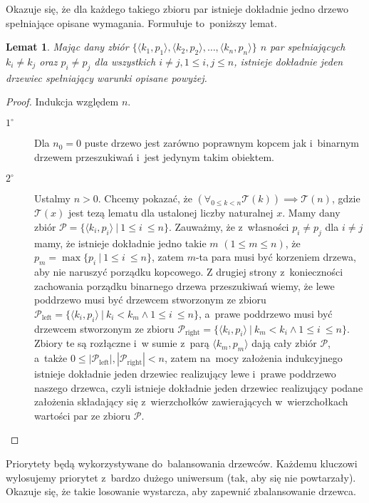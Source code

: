 \documentclass[declaration,shortabstract]{iithesis}
\theoremstyle{definition} \newtheorem{definition}{Definicja}[chapter]
\theoremstyle{plain} \newtheorem{remark}[definition]{Obserwacja}
\theoremstyle{plain} \newtheorem{theorem}[definition]{Twierdzenie}
\theoremstyle{plain} \newtheorem{example}{Przykład}[definition]
\theoremstyle{plain} \newtheorem{lemma}[definition]{Lemat}
\begin{document}
Okazuje się, że dla każdego takiego zbioru par istnieje dokładnie jedno drzewo spełniające opisane wymagania. Formułuje to~poniższy lemat.

\begin{lemma}
    Mając dany zbiór $\{ \langle k_1, p_1 \rangle, \langle k_2, p_2 \rangle, \ldots, \langle k_n, p_n \rangle \}$ $n$ par spełniających $k_i \neq k_j$ oraz $p_i \neq p_j$ dla wszystkich $i \neq j, 1 \leq i, j \leq n$, istnieje dokładnie jeden drzewiec spełniający warunki opisane powyżej.
\end{lemma}

\begin{proof}
Indukcja względem $n$.
\begin{description}
    \item[$1^\circ$] Dla $n_0 = 0$ puste drzewo jest zarówno poprawnym kopcem jak i~binarnym drzewem przeszukiwań i~jest jedynym takim obiektem.
    \item[$2^\circ$] Ustalmy $n > 0$. Chcemy pokazać, że $(\forall_{0 \leq k < n} \mathcal{T}(k)) \implies \mathcal{T}(n)$, gdzie $\mathcal{T}(x)$ jest tezą lematu dla ustalonej liczby naturalnej $x$. Mamy dany zbiór $\mathcal{P} = \{ \langle k_i, p_i \rangle \ | \ 1 \leq i~\leq n \}$. Zauważmy, że z~własności $p_i \neq p_j$ dla $i \neq j$ mamy, że istnieje dokładnie jedno takie $m$ $(1 \leq m \leq n)$, że $p_m = \max \{p_i \ |\ 1 \leq i~\leq n \}$, zatem $m$-ta para musi być korzeniem drzewa, aby nie naruszyć porządku kopcowego. Z drugiej strony z~konieczności zachowania porządku binarnego drzewa przeszukiwań wiemy, że lewe poddrzewo musi być drzewcem stworzonym ze zbioru $\mathcal{P}_{\text{left}} = \{ \langle k_i, p_i \rangle \ |\ k_i < k_m \land 1 \leq i~\leq n \}$, a~prawe poddrzewo musi być drzewcem stworzonym ze zbioru $\mathcal{P}_{\text{right}} = \{ \langle k_i, p_i \rangle\ |\ k_m < k_i \land 1 \leq i~\leq n \}$. Zbiory te są rozłączne i~w sumie z~parą $\langle k_m, p_m \rangle$ dają cały zbiór $\mathcal{P}$, a~także $0 \leq |\mathcal{P}_{\text{left}}|, |\mathcal{P}_{\text{right}}| < n$, zatem na~mocy założenia indukcyjnego istnieje dokładnie jeden drzewiec realizujący lewe i~prawe poddrzewo naszego drzewca, czyli istnieje dokładnie jeden drzewiec realizujący podane założenia składający się z~wierzchołków zawierających w~wierzchołkach wartości par ze zbioru $\mathcal{P}$. \qedhere
\end{description}
\end{proof}

Priorytety będą wykorzystywane do~balansowania drzewców. Każdemu kluczowi wylosujemy priorytet z~bardzo dużego uniwersum (tak, aby się nie powtarzały). Okazuje się, że takie losowanie wystarcza, aby zapewnić zbalansowanie drzewca.
\end{document}
